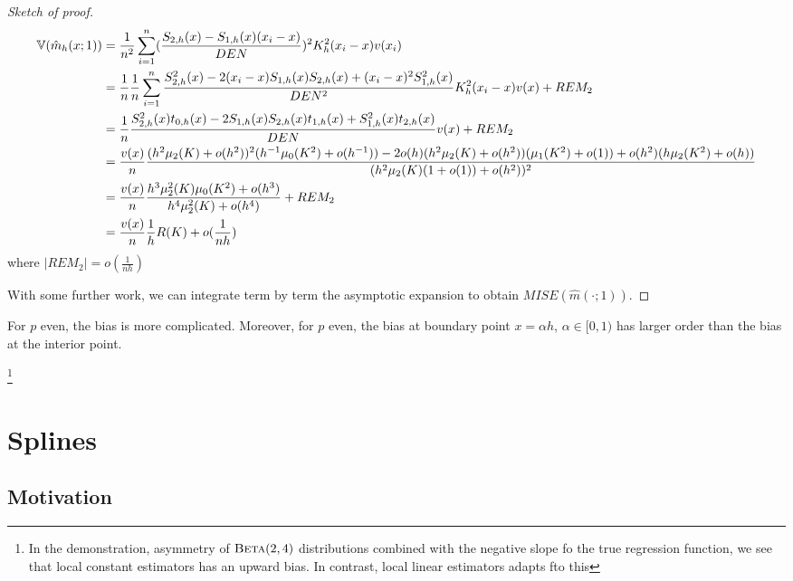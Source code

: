 \begin{proof}[Sketch of proof]
  \begin{align}
    \label{eq:63}
    \Var{\hat m_{h}(x; 1)} &= \frac{1}{n^{2}} \sum_{i=1}^{n}
    (\frac{S_{2, h}(x) - S_{1, h}(x)(x_{i} - x)}{DEN})^{2}
    K_{h}^{2}(x_{i} - x) v(x_{i}) \\
    &= \frac{1}{n} \frac{1}{n} \sum_{i=1}^{n} \frac{S_{2, h}^{2}(x) -
      2(x_{i} - x) S_{1, h}(x) S_{2, h}(x) + (x_{i} - x)^{2} S_{1,
        h}^{2}(x)}{DEN^{2}}  K^{2}_{h}(x_{i} - x) v(x) + REM_{2} \\
    &= \frac{1}{n} \frac{S_{2, h}^{2}(x) t_{0, h}(x) - 2 S_{1, h}(x)
      S_{2, h}(x) t_{1, h}(x) + S_{1, h}^{2}(x) t_{2, h}(x)}{DEN} v(x)
    + REM_{2} \\
    &= \frac{v(x)}{n} \frac{(h^{2} \mu_{2} (K) + o(h^{2}))^{2} (h^{-1}
      \mu_{0}(K^{2}) +o(h^{-1})) - 2 o(h) (h^{2} \mu_{2}(K) +
      o(h^{2}))(\mu_{1}(K^{2}) + o(1)) + o(h^{2}) (h \mu_{2} (K^{2}) +
      o(h))}{(h^{2} \mu_{2}(K)(1 + o(1)) + o(h^{2}))^{2}} \\
    &= \frac{v(x)}{n} \frac{h^{3} \mu_{2}^{2}(K) \mu_{0}(K^{2}) +
      o(h^{3})}{h^{4} \mu_{2}^{2}(K) + o(h^{4})} + REM_{2} \\
      &= \frac{v(x)}{n}  \frac{1}{h}  R(K) + o(\frac{1}{nh})
    \end{align} where $|REM_{2}| = o(\frac{1}{nh})$

    With some further work, we can integrate term by term the
    asymptotic expansion to obtain $MISE(\hat m(\cdot; 1))$.
\end{proof}

For $p$ even, the bias is more complicated.  Moreover, for $p$ even,
the bias at boundary point $x = \alpha h$, $\alpha \in [0, 1)$ has
larger order than the bias at the interior point.


\footnote{In the demonstration, asymmetry of $\textsc{Beta}(2, 4)$ distributions
combined with the negative slope fo the true regression function, we
see that local constant estimators has an upward bias.  In contrast,
local linear estimators adapts fto this}

\section{Splines}
\label{sec:splines}

\subsection{Motivation}
\label{sec:motivation}

